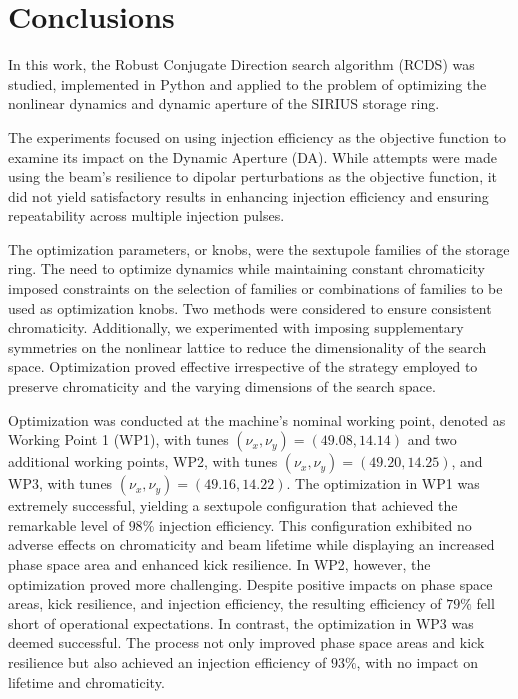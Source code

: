 \chapter{Conclusions}

In this work, the Robust Conjugate Direction search algorithm (RCDS) was studied, implemented in Python and applied to the problem of optimizing the nonlinear dynamics and dynamic aperture of the SIRIUS storage ring.

The experiments focused on using injection efficiency as the objective function to examine its impact on the Dynamic Aperture (DA). While attempts were made using the beam's resilience to dipolar perturbations as the objective function, it did not yield satisfactory results in enhancing injection efficiency and ensuring repeatability across multiple injection pulses.

The optimization parameters, or knobs, were the sextupole families of the storage ring. The need to optimize dynamics while maintaining constant chromaticity imposed constraints on the selection of families or combinations of families to be used as optimization knobs. Two methods were considered to ensure consistent chromaticity. Additionally, we experimented with imposing supplementary symmetries on the nonlinear lattice to reduce the dimensionality of the search space. Optimization proved effective irrespective of the strategy employed to preserve chromaticity and the varying dimensions of the search space.

Optimization was conducted at the machine's nominal working point, denoted as Working Point 1 (WP1), with tunes $(\nu_x, \nu_y)=(49.08, 14.14)$ and two additional working points, WP2, with tunes $(\nu_x, \nu_y)=(49.20, 14.25)$, and WP3, with tunes $(\nu_x, \nu_y)=(49.16, 14.22)$. The optimization in WP1 was extremely successful, yielding a sextupole configuration that achieved the remarkable level of $98\%$ injection efficiency. This configuration exhibited no adverse effects on chromaticity and beam lifetime while displaying an increased phase space area and enhanced kick resilience. In WP2, however, the optimization proved more challenging. Despite positive impacts on phase space areas, kick resilience, and injection efficiency, the resulting efficiency of $79\%$ fell short of operational expectations. In contrast, the optimization in WP3 was deemed successful. The process not only improved phase space areas and kick resilience but also achieved an injection efficiency of $93\%$, with no impact on lifetime and chromaticity.

